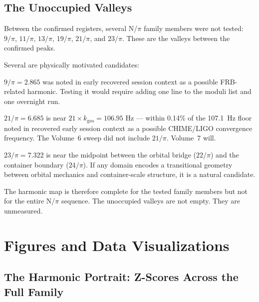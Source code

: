 \documentclass[11pt, letterpaper, openany]{book}
\begin{document}
\section*{The Unoccupied Valleys}

Between the confirmed registers, several N/$\pi$ family members were not tested:
$9/\pi$, $11/\pi$, $13/\pi$, $19/\pi$, $21/\pi$, and $23/\pi$.
These are the valleys between the confirmed peaks.

Several are physically motivated candidates:

$9/\pi = 2.865$ was noted in early recovered session context as a possible FRB-related harmonic.
Testing it would require adding one line to the moduli list and one overnight run.

$21/\pi = 6.685$ is near $21 \times k_\text{geo} = 106.95$ Hz --- within 0.14\% of the 107.1~Hz floor noted in recovered early session context as a possible CHIME/LIGO convergence frequency.
The Volume~6 sweep did not include $21/\pi$. Volume~7 will.

$23/\pi = 7.322$ is near the midpoint between the orbital bridge ($22/\pi$) and the container boundary ($24/\pi$).
If any domain encodes a transitional geometry between orbital mechanics and container-scale structure, it is a natural candidate.

The harmonic map is therefore complete for the tested family members but not for the entire N/$\pi$ sequence.
The unoccupied valleys are not empty. They are unmeasured.

\chapter{Figures and Data Visualizations}

\clearpage

\section{The Harmonic Portrait: Z-Scores Across the Full Family}
\end{document}
